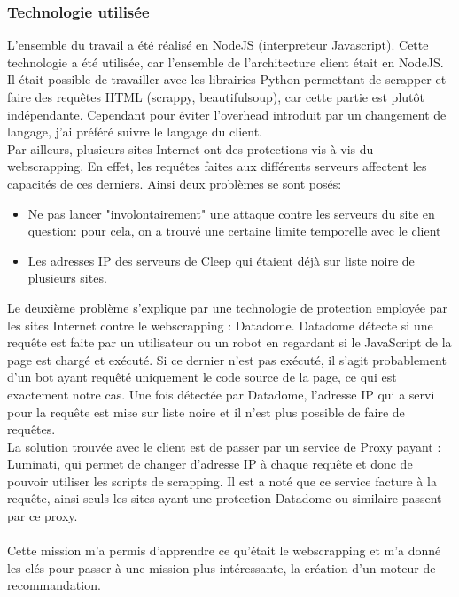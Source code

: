 \documentclass{article} %
\begin{document}
\subsubsection{Technologie utilisée\\}
L'ensemble du travail a été réalisé en NodeJS (interpreteur Javascript). Cette technologie a été utilisée, car l'ensemble de l'architecture client était en NodeJS. Il était possible de travailler avec les librairies Python permettant de scrapper et faire des requêtes HTML (scrappy, beautifulsoup), car cette partie est plutôt indépendante. Cependant pour éviter l'overhead introduit par un changement de langage, j'ai préféré suivre le langage du client.\\
Par ailleurs, plusieurs sites Internet ont des protections vis-à-vis du webscrapping. En effet, les requêtes faites aux différents serveurs affectent les capacités de ces derniers. Ainsi deux problèmes se sont posés:
\begin{itemize}
 \itemsep 0em
 \item Ne pas lancer "involontairement" une attaque contre les serveurs du site en question: pour cela, on a trouvé une certaine limite temporelle avec le client
 \item Les adresses IP des serveurs de Cleep qui étaient déjà sur liste noire de plusieurs sites.
\end{itemize}

Le deuxième problème s'explique par une technologie de protection employée par les sites Internet contre le webscrapping : Datadome. Datadome détecte si une requête est faite par un utilisateur ou un robot en regardant si le JavaScript de la page est chargé et exécuté. Si ce dernier n'est pas exécuté, il s'agit probablement d'un bot ayant requêté uniquement le code source de la page, ce qui est exactement notre cas. Une fois détectée par Datadome, l'adresse IP qui a servi pour la requête est mise sur liste noire et il n'est plus possible de faire de requêtes.\\

La solution trouvée avec le client est de passer par un service de Proxy payant : Luminati, qui permet de changer d'adresse IP à chaque requête et donc de pouvoir utiliser les scripts de scrapping. Il est a noté que ce service facture à la requête, ainsi seuls les sites ayant une protection Datadome ou similaire passent par ce proxy.\\ \\

Cette mission m'a permis d'apprendre ce qu'était le webscrapping et m'a donné les clés pour passer à une mission plus intéressante, la création d'un moteur de recommandation.
\end{document}
